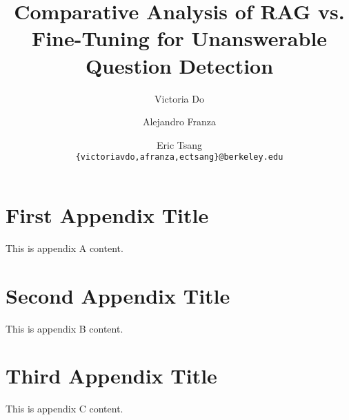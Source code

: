\documentclass[11pt]{article}
\title{Comparative Analysis of RAG vs. Fine-Tuning for Unanswerable Question Detection}
\author{Victoria Do \and Alejandro Franza \and Eric Tsang \\
        \texttt{\{victoriavdo,afranza,ectsang\}@berkeley.edu}}
\begin{document}
\maketitle


      







%

% 

\appendix
\section{First Appendix Title}
\label{sec:appendix-a}

This is appendix A content.

\section{Second Appendix Title}
\label{sec:appendix-b}

This is appendix B content.

\section{Third Appendix Title}
\label{sec:appendix-c}

This is appendix C content.
\end{document}
